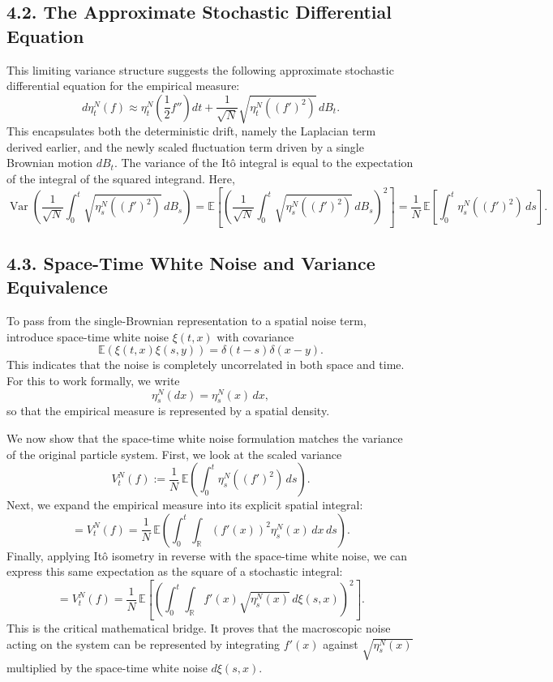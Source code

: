 \documentclass[11pt]{article}
\theoremstyle{definition}
\theoremstyle{remark}
\begin{document}
\subsection*{4.2. The Approximate Stochastic Differential Equation}
This limiting variance structure suggests the following approximate stochastic differential equation for the empirical measure:
\[
d\eta_t^N(f)\approx \eta_t^N\!\left(\frac{1}{2}f''\right)dt+\frac{1}{\sqrt{N}}\sqrt{\eta_t^N((f')^2)}\,dB_t.
\]
This encapsulates both the deterministic drift, namely the Laplacian term derived earlier, and the newly scaled fluctuation term driven by a single Brownian motion $dB_t$. The variance of the It\^o integral is equal to the expectation of the integral of the squared integrand. Here,
\[
\operatorname{Var}\!\left(\frac{1}{\sqrt{N}}\int_0^t \sqrt{\eta_s^N((f')^2)}\,dB_s\right)
=
\mathbb E\!\left[\left(\frac{1}{\sqrt{N}}\int_0^t \sqrt{\eta_s^N((f')^2)}\,dB_s\right)^2\right]
=
\frac{1}{N}\,\mathbb E\!\left[\int_0^t \eta_s^N((f')^2)\,ds\right].
\]

\subsection*{4.3. Space-Time White Noise and Variance Equivalence}
To pass from the single-Brownian representation to a spatial noise term, introduce space-time white noise $\xi(t,x)$ with covariance
\[
\mathbb E(\xi(t,x)\xi(s,y))=\delta(t-s)\delta(x-y).
\]
This indicates that the noise is completely uncorrelated in both space and time. For this to work formally, we write
\[
\eta_s^N(dx)=\eta_s^N(x)\,dx,
\]
so that the empirical measure is represented by a spatial density.

We now show that the space-time white noise formulation matches the variance of the original particle system. First, we look at the scaled variance
\[
V_t^N(f)
:=
\frac{1}{N}\,\mathbb E\!\left(\int_0^t \eta_s^N((f')^2)\,ds\right).
\]
Next, we expand the empirical measure into its explicit spatial integral:
\[
=
V_t^N(f)
=
\frac{1}{N}\,\mathbb E\!\left(\int_0^t \int_{\mathbb R} (f'(x))^2\eta_s^N(x)\,dx\,ds\right).
\]
Finally, applying It\^o isometry in reverse with the space-time white noise, we can express this same expectation as the square of a stochastic integral:
\[
=
V_t^N(f)
=
\frac{1}{N}\,\mathbb E\!\left[\left(\int_0^t \int_{\mathbb R} f'(x)\sqrt{\eta_s^N(x)}\,d\xi(s,x)\right)^2\right].
\]
This is the critical mathematical bridge. It proves that the macroscopic noise acting on the system can be represented by integrating $f'(x)$ against $\sqrt{\eta_s^N(x)}$ multiplied by the space-time white noise $d\xi(s,x)$.
\end{document}
